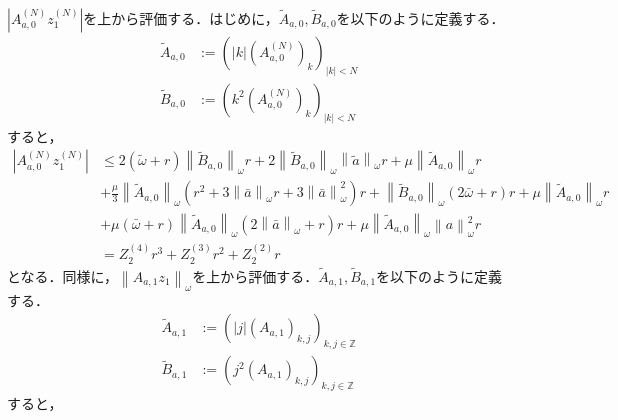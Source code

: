 $\left| A_{a,0}^{(N)} z_1^{(N)} \right|$を上から評価する．はじめに，$\tilde{A}_{a,0}, \tilde{B}_{a,0}$を以下のように定義する．
\begin{align*}
  \tilde{A}_{a,0} & := \left( \left| k \right| \left( A_{a,0}^{(N)} \right)_k \right)_{|k|<N} \\
  \tilde{B}_{a,0} & := \left( k^2 \left( A_{a,0}^{(N)} \right)_k \right)_{|k|<N}
\end{align*}
すると，
\begin{equation*}
  \begin{split}
    \left| A_{a,0}^{(N)} z_1^{(N)} \right| &\leq 2\left(\tilde{\omega} + r\right) \left\| \tilde{B}_{a,0} \right\|_\omega r + 2 \left\| \tilde{B}_{a,0} \right\|_\omega \left\| \tilde{a} \right\|_\omega r + \mu \left\| \tilde{A}_{a,0} \right\|_\omega r \\
    &+ \frac{\mu}{3} \left\| \tilde{A}_{a,0} \right\|_\omega \left( r^2 + 3 \left\| \bar{a} \right\|_\omega r + 3 \left\| \bar{a} \right\|^2_\omega \right) r + \left\| \tilde{B}_{a,0} \right\|_\omega \left( 2\bar{\omega} + r\right)r + \mu \left\| \tilde{A}_{a,0} \right\|_\omega r \\
    &+ \mu\left(\bar{\omega}+r\right)\left\| \tilde{A}_{a,0} \right\|_\omega \left( 2 \left\| \bar{a} \right\|_{\omega} + r\right)r + \mu \left\| \tilde{A}_{a,0} \right\|_\omega \left\| a \right\|_\omega^2 r\\
    &= Z_2^{(4)} r^3 + Z_2^{(3)} r^2 + Z_2^{(2)} r
  \end{split}
\end{equation*}
となる．同様に，$\left\| A_{a,1} z_1 \right\|_\omega$を上から評価する．$\tilde{A}_{a,1}, \tilde{B}_{a,1}$を以下のように定義する．
\begin{align*}
  \tilde{A}_{a,1} & := \left( \left| j \right| \left( A_{a,1} \right)_{k,j} \right)_{k,j\in\mathbb{Z}} \\
  \tilde{B}_{a,1} & := \left( j^2 \left( A_{a,1} \right)_{k,j} \right)_{k,j\in\mathbb{Z}}
\end{align*}
すると，
